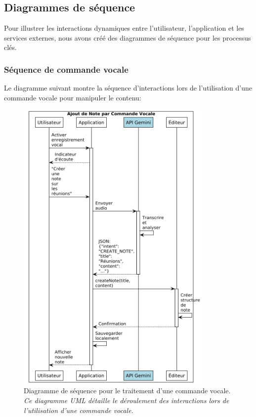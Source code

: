     \subsection{Diagrammes de séquence}
    
    Pour illustrer les interactions dynamiques entre l'utilisateur, l'application et les services externes, nous avons créé des diagrammes de séquence pour les processus clés.
    
    \subsubsection{Séquence de commande vocale}
    
    Le diagramme suivant montre la séquence d'interactions lors de l'utilisation d'une commande vocale pour manipuler le contenu:
    
        \begin{figure}[htbp]
        \centering
        \includegraphics[width=0.85\textwidth]{assets/docs/SayNote_sequence_voice.png}
        \caption{Diagramme de séquence pour le traitement d'une commande vocale. \newline\textit{Ce diagramme UML détaille le déroulement des interactions lors de l'utilisation d'une commande vocale.}}
        \label{fig:sequence_voice_command}
    \end{figure}
    
